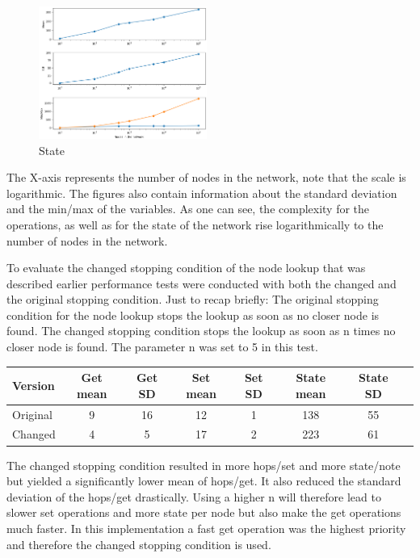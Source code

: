 \documentclass[a4paper, 12pt]{article} %
\begin{document}
\begin{figure}
    \begin{center}
        \includegraphics[width=0.49\textwidth]{images/state_figure.png}
    \end{center}
    \caption{State}
\end{figure}

The X-axis represents the number of nodes in the network, note that the scale is logarithmic. The figures also contain information about the standard deviation and the min/max of the variables. As one can see, the complexity for the operations, as well as for the state of the network rise logarithmically to the number of nodes in the network. 

\clearpage

To evaluate the changed stopping condition of the node lookup that was described earlier performance tests were conducted with both the changed and the original stopping condition. Just to recap briefly: The original stopping condition for the node lookup stops the lookup as soon as no closer node is found. The changed stopping condition stops the lookup as soon as n times no closer node is found. The parameter n was set to 5 in this test. 

\begin{table}[h]
\centering
\begin{tabular}{l*{6}{c}r}
Version           & Get mean & Get SD & Set mean & Set SD & State mean & State SD \\
\hline
Original          & 9        & 16     & 12       & 1      & 138        & 55       \\
Changed           & 4        & 5      & 17       & 2      & 223        & 61       \\
\end{tabular}
\end{table}

The changed stopping condition resulted in more hops/set and more state/note but yielded a significantly lower mean of hops/get. It also reduced the standard deviation of the hops/get drastically. Using a higher n will therefore lead to slower set operations and more state per node but also make the get operations much faster. In this implementation a fast get operation was the highest priority and therefore the changed stopping condition is used.
\end{document}
